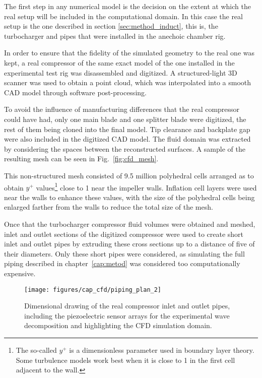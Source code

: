 The first step in any numerical model is the decision on the extent at which the real setup will be included in the computational domain. In this case the real setup is the one described in section \ref{sec:method_induct}, this is, the turbocharger and pipes that were installed in the anechoic chamber rig. 

In order to ensure that the fidelity of the simulated geometry to the real one was kept, a real compressor of the same exact model of the one installed in the experimental test rig was disassembled and digitized. A structured-light 3D scanner was used to obtain a point cloud, which was interpolated into a smooth CAD model through software post-processing.

To avoid the influence of manufacturing differences that the real compressor could have had, only one main blade and one splitter blade were digitized, the rest of them being cloned into the final model. Tip clearance and backplate gap were also included in the digitized CAD model. The fluid domain was extracted by considering the spaces between the reconstructed surfaces. A sample of the resulting mesh can be seen in Fig.~\ref{fig:cfd_mesh}.

This non-structured mesh consisted of 9.5 million polyhedral cells arranged as to obtain $y^+$ values\footnote{The so-called $y^+$ is a dimensionless parameter used in boundary layer theory. Some turbulence models work best when it is close to 1 in the first cell adjacent to the wall.} close to 1 near the impeller walls. Inflation cell layers were used near the walls to enhance these values, with the size of the polyhedral cells being enlarged farther from the walls to reduce the total size of the mesh.

Once that the turbocharger compressor fluid volumes were obtained and meshed, inlet and outlet sections of the digitized compressor were used to create short inlet and outlet pipes by extruding these cross sections up to a distance of five of their diameters. Only these short pipes were considered, as simulating the full piping described in chapter~\ref{cap:metod} was considered too computationally expensive. 

\begin{figure}
\centering
\texttt{[image: figures/cap\_cfd/piping\_plan\_2]}
\caption{Dimensional drawing of the real compressor inlet and outlet pipes, including the piezoelectric sensor arrays for the experimental wave decomposition and highlighting the CFD simulation domain.}
\label{fig:cfd_piping_plan}
\end{figure}

